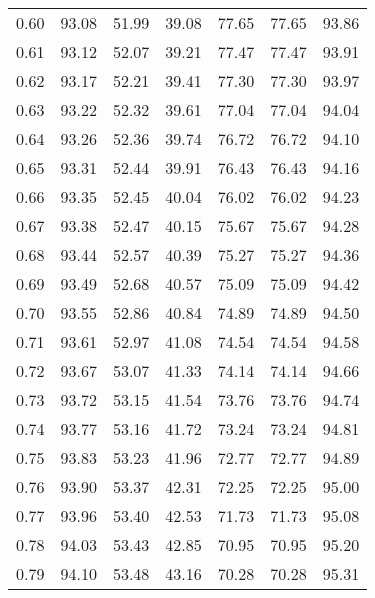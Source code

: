 \begin{tabular}{|c|c|c|c|c|c|c|}
      0.60 &     93.08 &     51.99 &      39.08 &   77.65 &      77.65 &         93.86 \\
      0.61 &     93.12 &     52.07 &      39.21 &   77.47 &      77.47 &         93.91 \\
      0.62 &     93.17 &     52.21 &      39.41 &   77.30 &      77.30 &         93.97 \\
      0.63 &     93.22 &     52.32 &      39.61 &   77.04 &      77.04 &         94.04 \\
      0.64 &     93.26 &     52.36 &      39.74 &   76.72 &      76.72 &         94.10 \\
      0.65 &     93.31 &     52.44 &      39.91 &   76.43 &      76.43 &         94.16 \\
      0.66 &     93.35 &     52.45 &      40.04 &   76.02 &      76.02 &         94.23 \\
      0.67 &     93.38 &     52.47 &      40.15 &   75.67 &      75.67 &         94.28 \\
      0.68 &     93.44 &     52.57 &      40.39 &   75.27 &      75.27 &         94.36 \\
      0.69 &     93.49 &     52.68 &      40.57 &   75.09 &      75.09 &         94.42 \\
      0.70 &     93.55 &     52.86 &      40.84 &   74.89 &      74.89 &         94.50 \\
      0.71 &     93.61 &     52.97 &      41.08 &   74.54 &      74.54 &         94.58 \\
      0.72 &     93.67 &     53.07 &      41.33 &   74.14 &      74.14 &         94.66 \\
      0.73 &     93.72 &     53.15 &      41.54 &   73.76 &      73.76 &         94.74 \\
      0.74 &     93.77 &     53.16 &      41.72 &   73.24 &      73.24 &         94.81 \\
      0.75 &     93.83 &     53.23 &      41.96 &   72.77 &      72.77 &         94.89 \\
      0.76 &     93.90 &     53.37 &      42.31 &   72.25 &      72.25 &         95.00 \\
      0.77 &     93.96 &     53.40 &      42.53 &   71.73 &      71.73 &         95.08 \\
      0.78 &     94.03 &     53.43 &      42.85 &   70.95 &      70.95 &         95.20 \\
      0.79 &     94.10 &     53.48 &      43.16 &   70.28 &      70.28 &         95.31 \\

\end{tabular}
